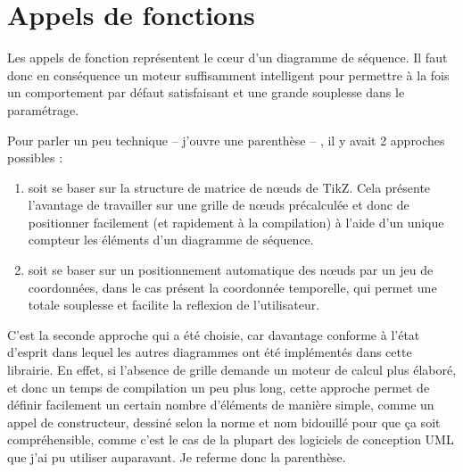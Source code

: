 \documentclass[a4paper,11pt]{report}
\newcommand{\inputTikZ}[1]{%
  }%
\newcommand{\inputTikZ}[1]{%
    \texttt{[image: fig/\#1.pdf]}%
  }%
\newcommand{\TikZ}{{\sc TikZ}}
\begin{document}
\medskip

\begin{minipage}{0.5\textwidth}

\end{minipage}
\begin{minipage}{0.5\textwidth}
\begin{center}
\inputTikZ{figure66}
\end{center}
\end{minipage}

\begin{minipage}{0.5\textwidth}

\end{minipage}
\begin{minipage}{0.5\textwidth}
\begin{center}
\inputTikZ{figure67}
\end{center}
\end{minipage}

\section{Appels de fonctions}\label{s.calls}

Les appels de fonction représentent le c\oe{}ur d'un diagramme de séquence. Il faut donc en conséquence un moteur suffisamment intelligent pour permettre à la fois un comportement par défaut satisfaisant et une grande souplesse dans le paramétrage. 

Pour parler un peu technique -- j'ouvre une parenthèse -- , il y avait 2 approches possibles :

\begin{enumerate}
\item soit se baser sur la structure de matrice de n\oe{}uds de \TikZ. Cela présente l'avantage de travailler sur une grille de n\oe{}uds précalculée et donc de positionner facilement (et rapidement à la compilation) à l'aide d'un unique compteur les éléments d'un diagramme de séquence. 
\item soit se baser sur un positionnement automatique des n\oe{}uds par un jeu de coordonnées, dans le cas présent la coordonnée temporelle, qui permet une totale souplesse et facilite la reflexion de l'utilisateur.
\end{enumerate}

C'est la seconde approche qui a été choisie, car davantage conforme à l'état d'esprit dans lequel les autres diagrammes ont été implémentés dans cette librairie. En effet, si l'absence de grille demande un moteur de calcul plus élaboré, et donc un temps de compilation un peu plus long, cette approche permet de définir facilement un certain nombre d'éléments de manière simple, comme un appel de constructeur, dessiné selon la norme et nom \og bidouillé\fg{} pour que ça soit compréhensible, comme c'est le cas de la plupart des logiciels de conception UML que j'ai pu utiliser auparavant. Je referme donc la parenthèse.
\end{document}
